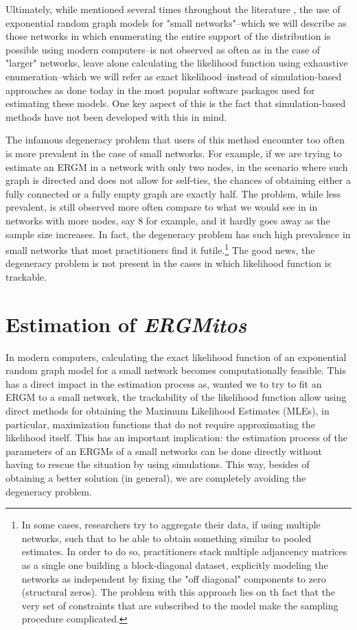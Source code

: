 \documentclass[12pt]{article}
\begin{document}
Ultimately, while mentioned several times throughout the literature \cite{Frank1986,Wasserman1996}, the use of exponential random graph models for "small networks"--which we will describe as those networks in which enumerating the entire support of the distribution is possible using modern computers--is not observed as often as in the case of "larger" networks, leave alone calculating the likelihood function using exhaustive enumeration--which we will refer as exact likelihood--instead of simulation-based approaches as done today in the most popular software packages used for estimating these models. One key aspect of this is the fact that simulation-based methods have not been developed with this in mind.

The infamous degeneracy problem \cite{Handcock2003} that users of this method encounter too often is more prevalent in the case of small networks. For example, if we are trying to estimate an ERGM in a network with only two nodes, in the scenario where such graph is directed and does not allow for self-ties, the chances of obtaining either a fully connected or a fully empty graph are exactly half. The problem, while less prevalent, is still observed more often compare to what we would see in in networks with more nodes, say 8 for example, and it hardly goes away as the sample size increases. In fact, the degeneracy problem has such high prevalence in small networks that most practitioners find it futile.\footnote{In some cases, researchers try to aggregate their data, if using multiple networks, such that to be able to obtain something similar to pooled estimates. In order to do so, practitioners stack multiple adjancency matrices as a single one building a block-diagonal dataset, explicitly modeling the networks as independent by fixing the "off diagonal" components to zero (structural zeros). The problem with this approach lies on th fact that the very set of constraints that are subscribed to the model make the sampling procedure complicated.} The good news, the degeneracy problem is not present in the cases in which likelihood function is trackable.

\section{Estimation of {\it ERGMitos}}

In modern computers, calculating the exact likelihood function of an exponential random graph model for a small network becomes computationally feasible. This has a direct impact in the estimation process as, wanted we to try to fit an ERGM to a small network, the trackability of the likelihood function allow using direct methods for obtaining the Maximum Likelihood Estimates (MLEs), in particular, maximization functions that do not require approximating the likelihood itself. This has an important implication: the estimation process of the parameters of an ERGMs of a small networks can be done directly without having to rescue the situation by using simulations. This way, besides of obtaining a better solution (in general), we are completely avoiding the degeneracy problem.
\end{document}
